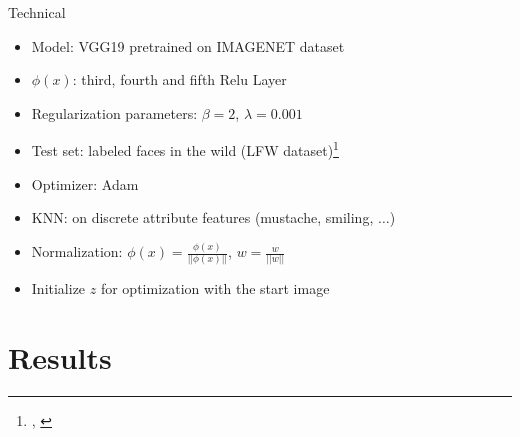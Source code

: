 \documentclass[11pt]{beamer}
\begin{document}
\begin{frame}{Technical}
	\begin{itemize}
		\setlength\itemsep{1em}
		\item Model: VGG19 pretrained on IMAGENET dataset
		\item $\phi(x)$: third, fourth and fifth Relu Layer
		\item Regularization parameters: $\beta=2$, $\lambda = 0.001$
		\item Test set: labeled faces in the wild (LFW dataset)\footnote{\cite{lfw}, \cite{lfw-df}}
		\item Optimizer: Adam
		\item KNN: on discrete attribute features (mustache, smiling, $\dots$)
		\item Normalization: $\phi(x) = \frac{\phi(x)}{||\phi(x)||}$, $w = \frac{w}{||w||}$
		\item Initialize $z$ for optimization with the start image
	\end{itemize} 
\end{frame}

\section{Results}

\end{document}
